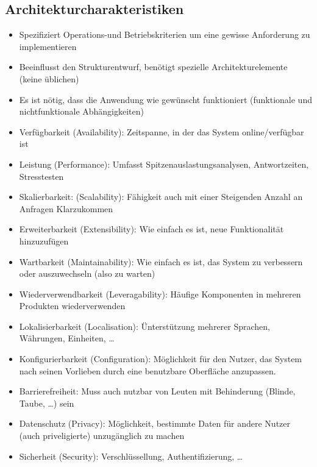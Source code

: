 \documentclass[
    ngerman,
    color=3b,
    summary,
    boxarc,
    main,
]{rubos-tuda-template}
\begin{document}
\subsection{Architekturcharakteristiken}
\begin{definition}[Architekturcharakteristik]\begin{itemize}
        \item Spezifiziert Operations-und Betriebskriterien um eine gewisse Anforderung zu implementieren
        \item Beeinflusst den Strukturentwurf, benötigt spezielle Architekturelemente (keine üblichen)
        \item Es ist nötig, dass die Anwendung wie gewünscht funktioniert (funktionale und nichtfunktionale Abhängigkeiten)
    \end{itemize}
\end{definition}
\begin{itemize}
    \item Verfügbarkeit (Availability): Zeitspanne, in der das System online/verfügbar ist
    \item Leistung (Performance): Umfasst Spitzenauslastungsanalysen, Antwortzeiten, Stresstesten
    \item Skalierbarkeit: (Scalability): Fähigkeit auch mit einer Steigenden Anzahl an Anfragen Klarzukommen
\end{itemize}
\begin{itemize}
    \item Erweiterbarkeit (Extensibility): Wie einfach es ist, neue Funktionalität hinzuzufügen
    \item Wartbarkeit (Maintainability): Wie einfach es ist, das System zu verbessern oder auszuwechseln (also zu warten)
    \item Wiederverwendbarkeit (Leveragability): Häufige Komponenten in mehreren Produkten wiederverwenden
    \item Lokalisierbarkeit (Localisation): Ünterstützung mehrerer Sprachen, Währungen, Einheiten, \dots
    \item Konfigurierbarkeit (Configuration): Möglichkeit für den Nutzer, das System nach seinen Vorlieben durch eine benutzbare Oberfläche anzupassen.
\end{itemize}
\begin{itemize}
    \item Barrierefreiheit: Muss auch nutzbar von Leuten mit Behinderung (Blinde, Taube, \dots) sein
    \item Datenschutz (Privacy): Möglichkeit, bestimmte Daten für andere Nutzer (auch priveligierte) unzugänglich zu machen
    \item Sicherheit (Security): Verschlüssellung, Authentifizierung, \dots
\end{itemize}
\end{document}
